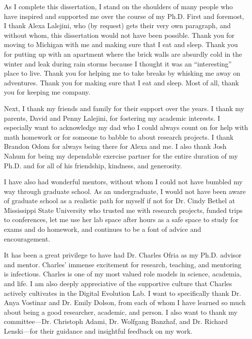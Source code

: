 
As I complete this dissertation, I stand on the shoulders of many people who have inspired and supported me over the course of my Ph.D.
First and foremost, I thank Alexa Lalejini, who (by request) gets their very own paragraph, and without whom, this dissertation would not have been possible. 
Thank you for moving to Michigan with me and making sure that I eat and sleep. 
Thank you for putting up with an apartment where the brick walls are absurdly cold in the winter and leak during rain storms because I thought it was an ``interesting'' place to live.
Thank you for helping me to take breaks by whisking me away on adventures. %
Thank you for making sure that I eat and sleep.
Most of all, thank you for keeping me company. 

Next, I thank my friends and family for their support over the years. 
I thank my parents, David and Penny Lalejini, for fostering my academic interests. %
I especially want to acknowledge my dad who I could always count on for help with math homework or for someone to babble to about research projects.
I thank Brandon Odom for always being there for Alexa and me.
I also thank Josh Nahum for being my dependable exercise partner for the entire duration of my Ph.D. and for all of his friendship, kindness, and generosity. 

I have also had wonderful mentors, without whom I could not have bumbled my way through graduate school. %
As an undergraduate, I would not have been aware of graduate school as a realistic path for myself if not for Dr. Cindy Bethel at Mississippi State University who trusted me with research projects, funded trips to conferences, let me use her lab space after hours as a safe space to study for exams and do homework, and continues to be a font of advice and encouragement.

It has been a great privilege to have had Dr. Charles Ofria as my Ph.D. advisor and mentor.
Charles' immense excitement for research, teaching, and mentoring is infectious. 
Charles is one of my most valued role models in science, academia, and life.
I am also deeply appreciative of the supportive culture that Charles actively cultivates in the Digital Evolution Lab.
I want to specifically thank Dr. Anya Vostinar and Dr. Emily Dolson,
from each of whom I have learned so much about being a good researcher, academic, and person.
I also want to thank my committee---Dr. Christoph Adami, Dr. Wolfgang Banzhaf, and Dr. Richard Lenski---for their guidance and insightful feedback on my work. 

